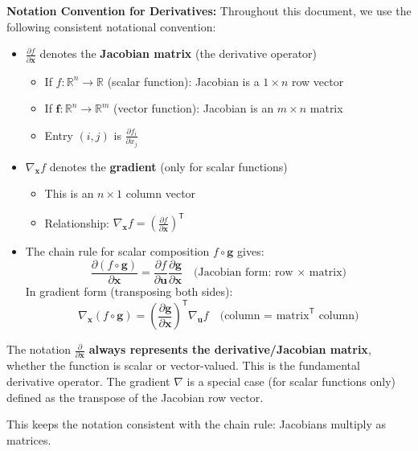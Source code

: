 \begin{notechapter}
\textbf{Notation Convention for Derivatives:}
Throughout this document, we use the following consistent notational convention:
\begin{itemize}[leftmargin=*,itemsep=2pt]
    \item $\frac{\partial f}{\partial \mathbf{x}}$ denotes the \textbf{Jacobian matrix} (the derivative operator)
    \begin{itemize}
        \item If $f: \mathbb{R}^n \to \mathbb{R}$ (scalar function): Jacobian is a $1 \times n$ row vector
        \item If $\mathbf{f}: \mathbb{R}^n \to \mathbb{R}^m$ (vector function): Jacobian is an $m \times n$ matrix
        \item Entry $(i,j)$ is $\frac{\partial f_i}{\partial x_j}$
    \end{itemize}
    \item $\nabla_{\mathbf{x}} f$ denotes the \textbf{gradient} (only for scalar functions)
    \begin{itemize}
        \item This is an $n \times 1$ column vector
        \item Relationship: $\nabla_{\mathbf{x}} f = \left(\frac{\partial f}{\partial \mathbf{x}}\right)^\mathsf{T}$
    \end{itemize}
    \item The chain rule for scalar composition $f \circ \mathbf{g}$ gives:
    \[
    \frac{\partial (f \circ \mathbf{g})}{\partial \mathbf{x}} = \frac{\partial f}{\partial \mathbf{u}} \frac{\partial \mathbf{g}}{\partial \mathbf{x}}
    \quad \text{(Jacobian form: row × matrix)}
    \]
    In gradient form (transposing both sides):
    \[
    \nabla_{\mathbf{x}}(f \circ \mathbf{g}) = \left(\frac{\partial \mathbf{g}}{\partial \mathbf{x}}\right)^\mathsf{T} \nabla_{\mathbf{u}} f
    \quad \text{(column = matrix}^\mathsf{T} \text{ column)}
    \]
\end{itemize}

\begin{keyinsight}[title=Why This Convention?]
The notation $\frac{\partial}{\partial \mathbf{x}}$ \textbf{always represents 
the derivative/Jacobian matrix}, whether the function is scalar or 
vector-valued. This is the fundamental derivative operator. The gradient 
$\nabla$ is a special case (for scalar functions only) defined as the 
transpose of the Jacobian row vector.

This keeps the notation consistent with the chain rule: Jacobians multiply 
as matrices.
\end{keyinsight}


\end{notechapter}
